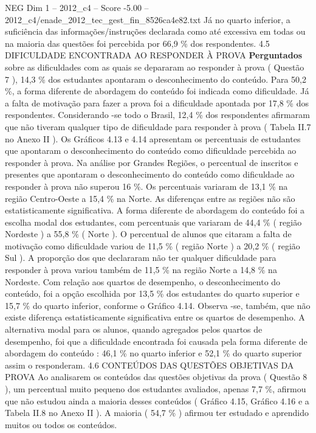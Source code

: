 \begin{textsample}{NEG Dim 1 – 2012\_c4 – Score -5.00 – 2012\_c4/enade\_2012\_tec\_gest\_fin\_8526ca4e82.txt}
Já no quarto inferior, a suficiência das informações/instruções declarada como até excessiva em todas ou na maioria das questões foi percebida por 66,9 \% dos respondentes. 4.5 DIFICULDADE ENCONTRADA AO RESPONDER À PROVA \textbf{Perguntados} sobre as dificuldades com as quais se depararam ao responder à prova ( Questão 7 ), 14,3 \% dos estudantes apontaram o desconhecimento do conteúdo.
Para 50,2 \%, a forma diferente de abordagem do conteúdo foi indicada como dificuldade.
Já a falta de motivação para fazer a prova foi a dificuldade apontada por 17,8 \% dos respondentes.
Considerando -se todo o Brasil, 12,4 \% dos respondentes afirmaram que não tiveram qualquer tipo de dificuldade para responder à prova ( Tabela II.7 no Anexo II ).
Os Gráficos 4.13 e 4.14 apresentam os percentuais de estudantes que apontaram o desconhecimento do conteúdo como dificuldade percebida ao responder à prova.
Na análise por Grandes Regiões, o percentual de inscritos e presentes que apontaram o desconhecimento do conteúdo como dificuldade ao responder à prova não superou 16 \%.
Os percentuais variaram de 13,1 \% na região Centro-Oeste a 15,4 \% na Norte.
As diferenças entre as regiões não são estatisticamente significativa.
A forma diferente de abordagem do conteúdo foi a escolha modal dos estudantes, com percentuais que variaram de 44,4 \% ( região Nordeste ) a 55,8 \% ( Norte ).
O percentual de alunos que citaram a falta de motivação como dificuldade variou de 11,5 \% ( região Norte ) a 20,2 \% ( região Sul ).
A proporção dos que declararam não ter qualquer dificuldade para responder à prova variou também de 11,5 \% na região Norte a 14,8 \% na Nordeste.
Com relação aos quartos de desempenho, o desconhecimento do conteúdo, foi a opção escolhida por 13,5 \% dos estudantes do quarto superior e 15,7 \% do quarto inferior, conforme o Gráfico 4.14.
Observa -se, também, que não existe diferença estatisticamente significativa entre os quartos de desempenho.
A alternativa modal para os alunos, quando agregados pelos quartos de desempenho, foi que a dificuldade encontrada foi causada pela forma diferente de abordagem do conteúdo : 46,1 \% no quarto inferior e 52,1 \% do quarto superior assim o responderam. 4.6 CONTEÚDOS DAS QUESTÕES OBJETIVAS DA PROVA Ao analisarem os conteúdos das questões objetivas da prova ( Questão 8 ), um percentual muito pequeno dos estudantes avaliados, apenas 7,7 \%, afirmou que não estudou ainda a maioria desses conteúdos ( Gráfico 4.15, Gráfico 4.16 e a Tabela II.8 no Anexo II ).
A maioria ( 54,7 \% ) afirmou ter estudado e aprendido muitos ou todos os conteúdos.

\end{textsample}
